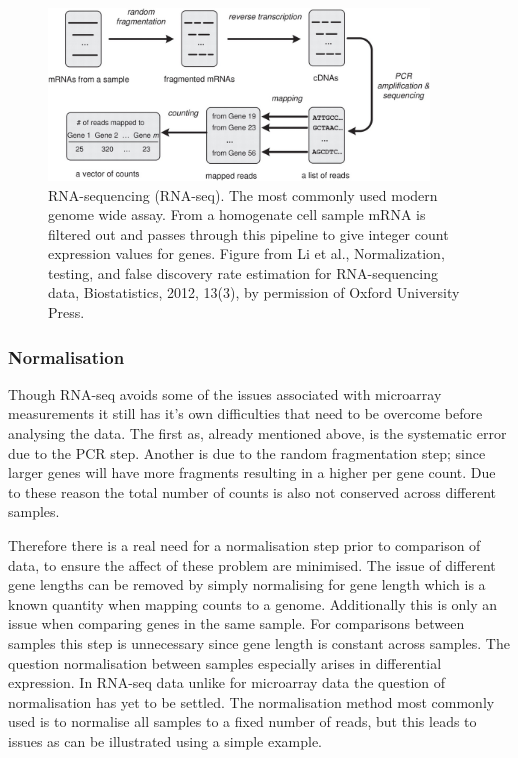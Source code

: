 \begin{figure}
  \centering
  \includegraphics[width=0.9\textwidth]{pics/li-biostats12.jpg}
  \caption{RNA-sequencing (RNA-seq). The most commonly used modern genome wide assay. From a homogenate cell sample mRNA is filtered out and passes through this pipeline to give integer count expression values for genes. Figure from Li et al., Normalization, testing, and false discovery rate estimation for RNA-sequencing data, Biostatistics, 2012, 13(3), by permission of Oxford University Press.}
  \label{fig:li-biostats}
\end{figure}

\subsubsection{Normalisation}
\label{sec:normalisation}

Though RNA-seq avoids some of the issues associated with microarray measurements it still has it's own difficulties that need to be overcome before analysing the data. The first as, already mentioned above, is the systematic error due to the PCR step. Another is due to the random fragmentation step; since larger genes will have more fragments resulting in a higher per gene count. Due to these reason the total number of counts is also not conserved across different samples. 

Therefore there is a real need for a normalisation step prior to comparison of data, to ensure the affect of these problem are minimised. The issue of different gene lengths can be removed by simply normalising for gene length which is a known quantity when  mapping counts to a genome. Additionally this is only an issue when comparing genes in the same sample. For comparisons between samples this step is unnecessary since gene length is constant across samples. The question normalisation between samples especially arises in differential expression. In RNA-seq data unlike for microarray data the question of normalisation has yet to be settled. The normalisation method most commonly used is to normalise all samples to a fixed number of reads, but this leads to issues as can be illustrated using a simple example. 

